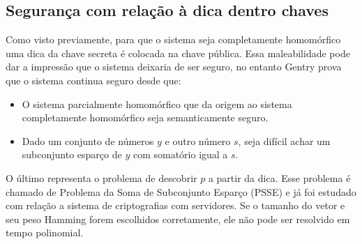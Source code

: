 \subsection{Segurança com relação à dica dentro chaves}
Como visto previamente, para que o sistema seja completamente homomórfico uma dica da chave secreta é colocada na chave pública. Essa maleabilidade pode dar a impressão que o sistema deixaria de ser seguro, no entanto Gentry prova que o sistema continua seguro desde que:
\begin{itemize}
	\item O sistema parcialmente homomórfico que da origem ao sistema completamente homomórfico seja semanticamente seguro.
	\item Dado um conjunto de números $y$ e outro número $s$, seja difícil achar um subconjunto esparço de $y$ com somatório igual a $s$.
\end{itemize}
O último representa o problema de descobrir $p$ a partir da dica. Esse problema é chamado de Problema da Soma de Subconjunto Esparço (PSSE) e já foi estudado com relação a sistema de criptografias com servidores. Se o tamanho do vetor e seu peso Hamming forem escolhidos corretamente, ele não pode ser resolvido em tempo polinomial.
